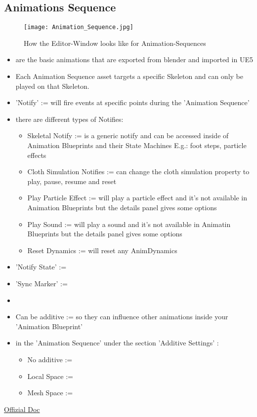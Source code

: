         \subsection{Animations Sequence}
            \begin{figure}
                \texttt{[image: Animation\_Sequence.jpg]}
                \caption{How the Editor-Window looks like for Animation-Sequences}
            \end{figure}
            \begin{itemize}
                \item are the basic animations that are exported from blender and imported in UE5
                \item Each Animation Sequence asset targets a specific Skeleton and can only be played on that Skeleton.
                \item 'Notify' := will fire events at specific points during the 'Animation Sequence'
                \item there are different types of Notifies:
                \begin{itemize}
                    \item Skeletal Notify := is a generic notify and can be accessed inside of Animation Blueprints and their State Machines E.g.: foot steps, particle effects
                    \item Cloth Simulation Notifies := can change the cloth simulation property to play, pause, resume and reset 
                    \item Play Particle Effect := will play a particle effect and it's not available in Animation Blueprints but the details panel gives some options
                    \item Play Sound := will play a sound and it's not available in Animatin Blueprints but the details panel gives some options
                    \item Reset Dynamics := will reset any AnimDynamics
                \end{itemize}
                \item 'Notify State' := 
                \item 'Sync Marker' :=
                \item 
                \item Can be additive := so they can influence other animations inside your 'Animation Blueprint'
                \item in the 'Animation Sequence' under the section 'Additive Settings' :
                \begin{itemize}
                    \item No additive := 
                    \item Local Space := 
                    \item Mesh Space := 
                \end{itemize}
            \end{itemize}
            \href{https://docs.unrealengine.com/4.27/en-US/AnimatingObjects/SkeletalMeshAnimation/Sequences/}{Offizial Doc}

